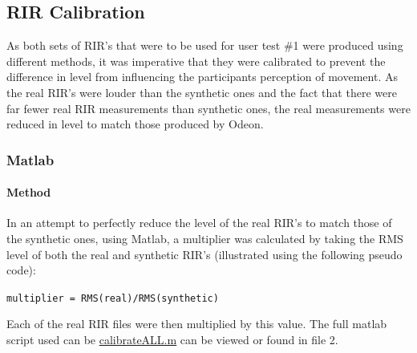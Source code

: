 \documentclass[../../main.tex]{subfiles}
\begin{document}
	\subsection{RIR Calibration}
		
		As both sets of \ac{RIR}'s that were to be used for user test \#1 were produced using different methods, it was imperative that they were calibrated to prevent the difference in level from influencing the participants perception of movement. As the real \ac{RIR}'s were louder than the synthetic ones and the fact that there were far fewer real \ac{RIR} measurements than synthetic ones, the real measurements were reduced in level to match those produced by Odeon.

		\subsubsection{Matlab}

			\paragraph{Method}

			In an attempt to perfectly reduce the level of the real \ac{RIR}'s to match those of the synthetic ones, using Matlab, a multiplier was calculated by taking the RMS level of both the real and synthetic \ac{RIR}'s (illustrated using the following pseudo code):

			\vspace{3mm}
			\begin{center}
				\texttt{multiplier = RMS(real)/RMS(synthetic)}\\
			\end{center}
			\vspace{3mm}

			Each of the real \ac{RIR} files were then multiplied by this value. The full matlab script used can be \href{http://lt669.github.io/code/matlab/html/calibrateAll.html}{calibrateALL.m} can be viewed or found in file 2.
			
\end{document}
